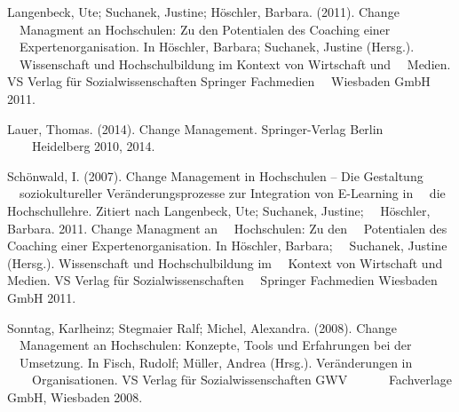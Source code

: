 \documentclass{article}
\begin{document}
\bigskip


\bigskip


\bigskip

Langenbeck, Ute; Suchanek, Justine; Höschler, Barbara. (2011). Change \ \ Managment an Hochschulen: Zu den Potentialen
des Coaching einer \ \ Expertenorganisation. In Höschler, Barbara; Suchanek, Justine (Hersg.). \ \ Wissenschaft und
Hochschulbildung im Kontext von Wirtschaft und \ \ Medien. VS Verlag f\"{u}r Sozialwissenschaften {\textbar} Springer
Fachmedien \ \ Wiesbaden GmbH 2011.


\bigskip

Lauer, Thomas. (2014). Change Management. Springer-Verlag Berlin \ \ \ \ Heidelberg 2010, 2014. 


\bigskip

Sch\"{o}nwald, I. (2007). Change Management in Hochschulen – Die Gestaltung \ \ soziokultureller
Ver\"{a}nderungsprozesse zur Integration von E-Learning in \ \ die Hochschullehre. Zitiert nach Langenbeck, Ute;
Suchanek, Justine; \ \ Höschler, Barbara. 2011. Change Managment an \ \ Hochschulen: Zu den \ \ Potentialen des
Coaching einer Expertenorganisation. In Höschler, Barbara; \ \ Suchanek, Justine (Hersg.). Wissenschaft und
Hochschulbildung im \ \ Kontext von Wirtschaft und Medien. VS Verlag f\"{u}r Sozialwissenschaften \ \ Springer
Fachmedien Wiesbaden GmbH 2011.


\bigskip

Sonntag, Karlheinz; Stegmaier Ralf; Michel, Alexandra. (2008). Change \ \ Management an Hochschulen: Konzepte, Tools und
Erfahrungen bei der \ \ Umsetzung. In Fisch, Rudolf; Müller, Andrea (Hrsg.). Veränderungen in \ \ \ \ Organisationen.
VS Verlag f\"{u}r Sozialwissenschaften {\textbar} GWV \ \ \ \ \ \ Fachverlage GmbH, Wiesbaden 2008. 


\bigskip


\bigskip


\bigskip


\bigskip


\bigskip


\bigskip


\bigskip


\bigskip
\end{document}
